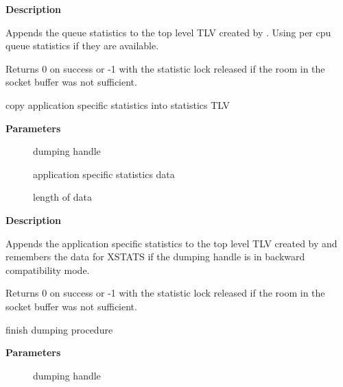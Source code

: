 \documentclass[a4paper,8pt,english]{sphinxmanual}
\begin{document}
\textbf{Description}

Appends the queue statistics to the top level TLV created by
{\hyperref[networking/kapi:c.gnet_stats_start_copy]{\emph{}}}. Using per cpu queue statistics if
they are available.

Returns 0 on success or -1 with the statistic lock released
if the room in the socket buffer was not sufficient.

\begin{fulllineitems}
\label{networking/kapi:c.gnet_stats_copy_app}
copy application specific statistics into statistics TLV

\end{fulllineitems}


\textbf{Parameters}
\begin{description}
\item[{}] \leavevmode
dumping handle

\item[{}] \leavevmode
application specific statistics data

\item[{}] \leavevmode
length of data

\end{description}

\textbf{Description}

Appends the application specific statistics to the top level TLV created by
{\hyperref[networking/kapi:c.gnet_stats_start_copy]{\emph{}}} and remembers the data for XSTATS if the dumping
handle is in backward compatibility mode.

Returns 0 on success or -1 with the statistic lock released
if the room in the socket buffer was not sufficient.

\begin{fulllineitems}
\label{networking/kapi:c.gnet_stats_finish_copy}
finish dumping procedure

\end{fulllineitems}


\textbf{Parameters}
\begin{description}
\item[{}] \leavevmode
dumping handle

\end{description}
\end{document}
